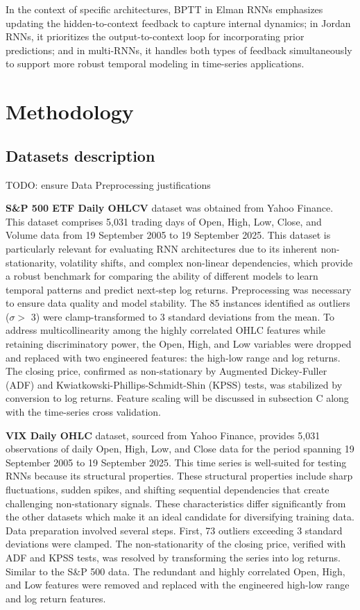 \documentclass[conference, 10pt]{IEEEtran}
\begin{document}
In the context of specific architectures, BPTT in Elman RNNs emphasizes updating the hidden-to-context feedback to
capture internal dynamics; in Jordan RNNs, it prioritizes the output-to-context loop for incorporating prior
predictions; and in multi-RNNs, it handles both types of feedback simultaneously to support more robust temporal
modeling in time-series applications.

\section{Methodology}
\subsection{Datasets description}
TODO: ensure Data Preprocessing justifications

\textbf{S\&P 500 ETF Daily OHLCV} dataset was obtained from Yahoo Finance. This dataset comprises 5,031 trading days of
Open, High, Low, Close, and Volume data from 19 September 2005 to 19 September 2025. This dataset is particularly
relevant for evaluating RNN architectures due to its inherent non-stationarity, volatility shifts, and complex
non-linear dependencies, which provide a robust benchmark for comparing the ability of different models to learn
temporal patterns and predict next-step log returns. Preprocessing was necessary to ensure data quality and model
stability. The 85 instances identified as outliers ($\sigma >$ 3) were clamp-transformed to 3 standard deviations from
the mean. To address multicollinearity among the highly correlated OHLC features while retaining discriminatory power,
the Open, High, and Low variables were dropped and replaced with two engineered features: the high-low range and log
returns. The closing price, confirmed as non-stationary by Augmented Dickey-Fuller (ADF) and
Kwiatkowski-Phillips-Schmidt-Shin (KPSS) tests, was stabilized by conversion to log returns. Feature scaling will be
discussed in subsection C along with the time-series cross validation.

\textbf{VIX Daily OHLC} dataset, sourced from Yahoo Finance, provides 5,031 observations of daily Open, High, Low, and
Close data for the period spanning 19 September 2005 to 19 September 2025. This time series is well-suited for testing
RNNs because its structural properties. These structural properties include sharp fluctuations, sudden spikes, and
shifting sequential dependencies that create challenging non-stationary signals. These characteristics differ
significantly from the other datasets which make it an ideal candidate for diversifying training data. Data preparation
involved several steps. First, 73 outliers exceeding 3 standard deviations were clamped. The non-stationarity of the
closing price, verified with ADF and KPSS tests, was resolved by transforming the series into log returns. Similar to
the S\&P 500 data. The redundant and highly correlated Open, High, and Low features were removed and replaced with the
engineered high-low range and log return features.
\end{document}
